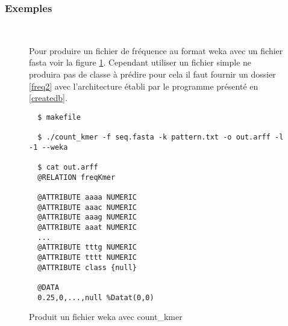 \subsubsection{Exemples}


~\\
\begin{figure}[H]

Pour produire un fichier de fréquence au format weka avec un fichier fasta voir la figure \ref{freq1}.
Cependant utiliser un fichier simple ne produira pas de classe à prédire pour cela il faut fournir un dossier \ref{freq2}
avec l'architecture établi par le programme présenté en \ref{createdb}.
\begin{center}
\begin{verbatim}
  $ makefile
  
  $ ./count_kmer -f seq.fasta -k pattern.txt -o out.arff -l -1 --weka
  
  $ cat out.arff
  @RELATION freqKmer

  @ATTRIBUTE aaaa NUMERIC
  @ATTRIBUTE aaac NUMERIC
  @ATTRIBUTE aaag NUMERIC
  @ATTRIBUTE aaat NUMERIC
  ...
  @ATTRIBUTE tttg NUMERIC
  @ATTRIBUTE tttt NUMERIC
  @ATTRIBUTE class {null}

  @DATA
  0.25,0,...,null %Datat(0,0)

  \end{verbatim}
\end{center}
\caption{\label{freq1}Produit un fichier weka avec count\_kmer}
\end{figure}
~\\

